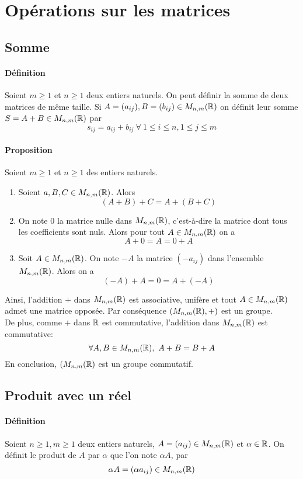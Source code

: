 %
%
\section{Opérations sur les matrices}
%
%

%
\subsection{Somme}
%
\paragraph{Définition} Soient $m\geq 1$ et $n \geq 1$ deux entiers naturels. On peut définir la somme de deux matrices de même taille. Si $A = (a_{ij}), B = (b_{ij}) \in M_{n, m}(\mathbb{R})$ on définit leur somme $S = A + B \in M_{n, m}(\mathbb{R})$ par
$$s_{ij} = a_{ij} + b_{ij} ~ \forall ~ 1 \leq i \leq n, 1 \leq j \leq m$$

\paragraph{Proposition} Soient $m \geq 1$ et $n\geq 1$ des entiers naturels.
\begin{enumerate}
  \item Soient $a, B, C \in M_{n, m}(\mathbb{R})$. Alors
    $$(A + B) + C = A + (B + C)$$
  \item On note $0$ la matrice nulle dans $M_{n, m}(\mathbb{R})$, c'est-à-dire la matrice dont tous les coefficients sont nuls. Alors pour tout $A \in M_{n, m}(\mathbb{R})$ on a
    $$A + 0 = A = 0 + A$$
  \item Soit $A \in M_{n, m}(\mathbb{R})$. On note $-A$ la matrice $(-a_{ij})$ dans l'ensemble $M_{n, m}(\mathbb{R})$. Alors on a
    $$(-A) + A = 0 = A + (-A)$$
\end{enumerate}
Ainsi, l'addition $+$ dans $M_{n, m}(\mathbb{R})$ est associative, unifère et tout $A \in M_{n, m}(\mathbb{R})$ admet une matrice opposée. Par conséquence $(M_{n, m}(\mathbb{R}), +)$ est un groupe.\\
De plus, comme $+$ dans $\mathbb{R}$ est commutative, l'addition dans $M_{n,m}(\mathbb{R})$ est commutative:
$$\forall A, B \in M_{n, m}(\mathbb{R}), ~ A + B = B + A$$
En conclusion, $(M_{n, m}(\mathbb{R})$ est un groupe commutatif.

%
\subsection{Produit avec un réel}
%
\paragraph{Définition} Soient $n \geq 1, m \geq 1$ deux entiers naturels, $A = (a_{ij}) \in M_{n, m}(\mathbb{R})$ et $\alpha \in \mathbb{R}$. On  définit le produit de $A$ par $\alpha$ que l'on note $\alpha A$, par
$$\alpha A = (\alpha a_{ij}) \in M_{n, m}(\mathbb{R})$$

